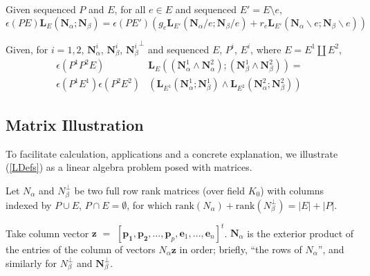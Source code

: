 \documentclass[Unicode]{cedram-alco}
\newcommand{\ext}[1]{\ensuremath{\mathbf{#1}}}
\newcommand{\Nal}{\ensuremath{N_{\alpha}}}
\newcommand{\NbePe}{\ensuremath{N_{\beta}^{\perp}}}
\newcommand{\eNal}{\ensuremath{\ext{N}_{\alpha}}}
\newcommand{\eNbe}{\ensuremath{\ext{N}_\beta}}
\newcommand{\dunion}{\coprod}
\newcommand{\extLHorSub}[3]{\ext{L}_{#1}\left(  {#2}; {#3}  \right)}
\newcommand{\LHorSub}[3]{\ext{L}_{#1}\left(  {#2}; {#3}  \right)}
\begin{document}
\begin{theo*}
  Given sequenced $P$ and $E$, for all $e\in E$ and sequenced $E'=E\setminus e$,
  \begin{equation}\label{delecontrequation-intro}
     \epsilon(PE)\extLHorSub{E}{\eNal}{\eNbe}=
      \epsilon(PE')
      \left(
      g_e\extLHorSub{E'}{\eNal/e}{\eNbe/e} +
      r_e\extLHorSub{E'}{\eNal\backslash e}{\eNbe\backslash e}\right)
  \end{equation}
\end{theo*}




\begin{theo*}
Given, for $i = 1, 2$,
  $\ext{N}_\alpha^{i}$,  $\ext{N}_\beta^{i}$, ${\ext{N}_\beta^{i}}^\perp$ 
  and
  sequenced $E$, $P^{i}$, $E^{i}$, where $E=E^{1}\dunion E^{2}$,
  \begin{equation}\label{productequation-intro}
    \begin{split}
    \epsilon(P^1P^2E)
    &\LHorSub{E}
            {(\ext{N}_\alpha^{1}\wedge\ext{N}_\alpha^{2})}
            {(\ext{N}_\beta^{1}\wedge\ext{N}_\beta^{2})}
    = \\
    \epsilon(P^{1}E^{1})
    \epsilon(P^{2}E^{2}) 
        &\left(\LHorSub{E^{1}}{\ext{N}_\alpha^{1}}{\ext{N}_\beta^{1}}
        \wedge
        \LHorSub{E^{2}}{\ext{N}_\alpha^{2}}{\ext{N}_\beta^{2}}
          \right)
    \end{split}
  \end{equation}
\end{theo*}

\subsection{Matrix Illustration}
To facilitate calculation, applications and a concrete explanation,
we illustrate (\ref{LDefs}) as a linear algebra problem
posed with matrices.

Let $\Nal$ and $\NbePe$ be two full row rank matrices (over field $K_0$)
with columns indexed by $P\cup E$, $P\cap E=\emptyset$,
for which $\text{rank}(\Nal)+\text{rank}(\NbePe)=|E|+|P|$.

Take column vector $\ext{z}$
$=$ $[\ext{p_1},\ext{p_2},\ldots,\ext{p}_p,\ext{e}_1,\ldots,\ext{e}_n]^t$.
$\ext{N}_\alpha$ is the exterior product of the entries
of the column of vectors $\Nal \ext{z}$  in order; briefly, ``the rows of $\Nal$'',
and similarly for $\NbePe$ and $\ext{N}_\beta^\perp$.
\end{document}
